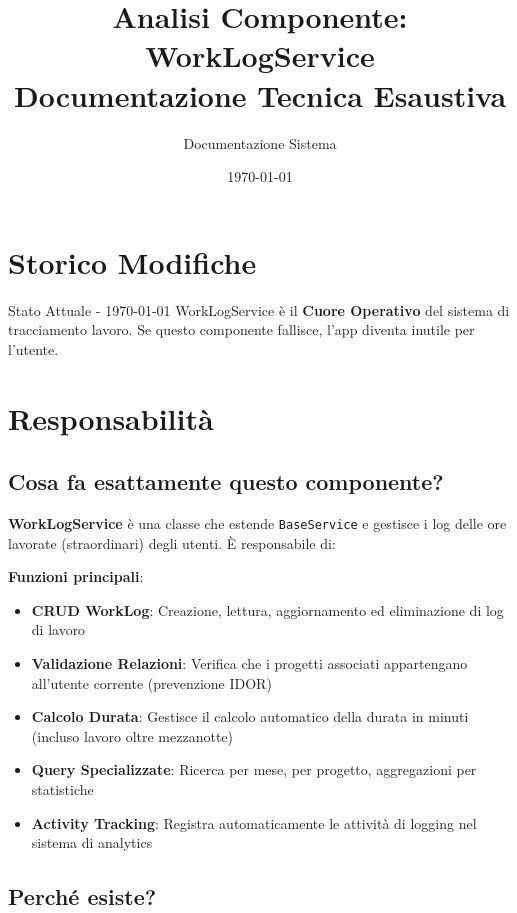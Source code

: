 \documentclass[11pt,a4paper]{article}
\title{\textbf{Analisi Componente: WorkLogService}\\
\large Documentazione Tecnica Esaustiva}
\author{Documentazione Sistema}
\date{\today}
\begin{document}
\maketitle
\tableofcontents
\newpage

\section{Storico Modifiche}

\begin{importantbox}{Stato Attuale - \today}
WorkLogService è il \textbf{Cuore Operativo} del sistema di tracciamento lavoro.
Se questo componente fallisce, l'app diventa inutile per l'utente.
\end{importantbox}

\section{Responsabilità}

\subsection{Cosa fa esattamente questo componente?}

\textbf{WorkLogService} è una classe che estende \texttt{BaseService} e gestisce i log delle ore lavorate (straordinari) degli utenti. È responsabile di:

\textbf{Funzioni principali}:
\begin{itemize}
    \item \textbf{CRUD WorkLog}: Creazione, lettura, aggiornamento ed eliminazione di log di lavoro
    \item \textbf{Validazione Relazioni}: Verifica che i progetti associati appartengano all'utente corrente (prevenzione IDOR)
    \item \textbf{Calcolo Durata}: Gestisce il calcolo automatico della durata in minuti (incluso lavoro oltre mezzanotte)
    \item \textbf{Query Specializzate}: Ricerca per mese, per progetto, aggregazioni per statistiche
    \item \textbf{Activity Tracking}: Registra automaticamente le attività di logging nel sistema di analytics
\end{itemize}

\subsection{Perché esiste?}
\end{document}

